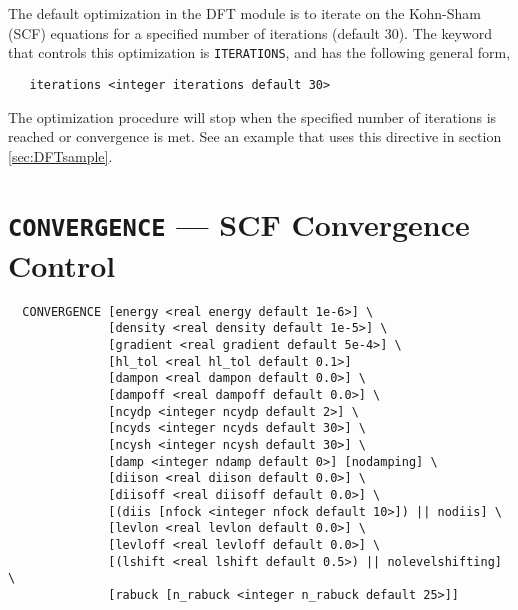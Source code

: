 The default optimization in the DFT module is to iterate on the 
Kohn-Sham (SCF) equations for a specified number of iterations
(default 30).  The keyword that controls this optimization 
is \verb+ITERATIONS+, and has the following general form,

\begin{verbatim}
   iterations <integer iterations default 30>
\end{verbatim}

The optimization procedure will stop when the specified number of
iterations is reached or convergence is met.  See an example
that uses this directive in section \ref{sec:DFTsample}.

\section{{\tt CONVERGENCE} --- SCF Convergence Control}
\label{sec:dftconv}

\begin{verbatim}
  CONVERGENCE [energy <real energy default 1e-6>] \
              [density <real density default 1e-5>] \
              [gradient <real gradient default 5e-4>] \
              [hl_tol <real hl_tol default 0.1>]
              [dampon <real dampon default 0.0>] \
              [dampoff <real dampoff default 0.0>] \
              [ncydp <integer ncydp default 2>] \
              [ncyds <integer ncyds default 30>] \
              [ncysh <integer ncysh default 30>] \
              [damp <integer ndamp default 0>] [nodamping] \
              [diison <real diison default 0.0>] \
              [diisoff <real diisoff default 0.0>] \
              [(diis [nfock <integer nfock default 10>]) || nodiis] \
              [levlon <real levlon default 0.0>] \
              [levloff <real levloff default 0.0>] \
              [(lshift <real lshift default 0.5>) || nolevelshifting] \
              [rabuck [n_rabuck <integer n_rabuck default 25>]]
\end{verbatim}


